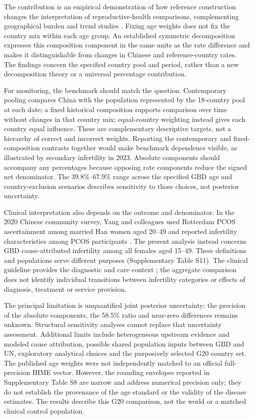 \documentclass[11pt,a4paper]{article}
\begin{document}
The contribution is an empirical demonstration of how reference construction changes the interpretation of reproductive-health comparisons, complementing geographical burden and trend studies \citep{liu_pcos2024,liang_burden2025,liang_trend2026}. Fixing age weights does not fix the country mix within each age group. An established symmetric decomposition expresses this composition component in the same units as the rate difference and makes it distinguishable from changes in Chinese and reference-country rates. The findings concern the specified country pool and period, rather than a new decomposition theory or a universal percentage contribution.

For monitoring, the benchmark should match the question. Contemporary pooling compares China with the population represented by the 18-country pool at each date; a fixed historical composition supports comparison over time without changes in that country mix; equal-country weighting instead gives each country equal influence. These are complementary descriptive targets, not a hierarchy of correct and incorrect weights. Reporting the contemporary and fixed-composition contrasts together would make benchmark dependence visible, as illustrated by secondary infertility in 2023. Absolute components should accompany any percentages because opposing rate components reduce the signed net denominator. The 39.8\%--67.9\% range across the specified GBD age and country-exclusion scenarios describes sensitivity to those choices, not posterior uncertainty.

Clinical interpretation also depends on the outcome and denominator. In the 2020 Chinese community survey, Yang and colleagues used Rotterdam PCOS ascertainment among married Han women aged 20--49 and reported infertility characteristics among PCOS participants \citep{yang}. The present analysis instead concerns GBD cause-attributed infertility among all females aged 15--49. These definitions and populations serve different purposes (Supplementary Table S11). The clinical guideline provides the diagnostic and care context \citep{pcos}; the aggregate comparison does not identify individual transitions between infertility categories or effects of diagnosis, treatment or service provision.

The principal limitation is unquantified joint posterior uncertainty: the precision of the absolute components, the 58.5\% ratio and near-zero differences remains unknown. Structural sensitivity analyses cannot replace that uncertainty assessment. Additional limits include heterogeneous upstream evidence and modeled cause attribution, possible shared population inputs between GBD and UN, exploratory analytical choices and the purposively selected G20 country set. The published age weights were not independently matched to an official full-precision IHME vector. However, the rounding envelopes reported in Supplementary Table S8 are narrow and address numerical precision only; they do not establish the provenance of the age standard or the validity of the disease estimates. The results describe this G20 comparison, not the world or a matched clinical control population.
\end{document}
